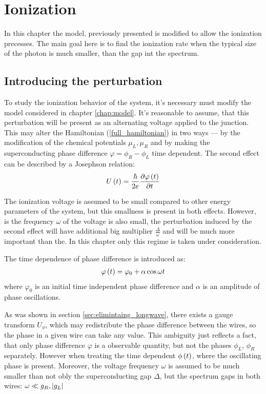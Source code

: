 \chapter{Ionization}

In this chapter the model, previously presented is modified to allow the ionization precesses. The main goal here is to find the ionization rate when the typical size of the photon is much smaller, than the gap int the spectrum.

\section{Introducing the perturbation}

To study the ionization behavior of the system, it's necessary must modify the model considered in chapter \ref{chap:model}. It's reasonable to assume, that this perturbation will be present as an alternating voltage applied to the junction. This may alter the Hamiltonian (\ref{full_hamiltonian}) in two ways --- by the modification of the chemical potentials $ \mu_L, \mu_R $ and by making the superconducting phase difference $ \varphi=\phi_R-\phi_L $ time dependent. The second effect can be described by a Josephson relation:
\begin{gather}
	U\left(t\right)
	=
	\frac{\hbar}{2e}
	\frac{\partial\varphi\left(t\right)}{\partial t}
\end{gather}

The ionization voltage is assumed to be small compared to other energy parameters of the system, but this smallness is present in both effects. However, is the frequency $ \omega $ of the voltage is also small, the perturbation induced by the second effect will have additional big multiplier $ \frac{\Delta}{\omega} $ and will be much more important than the. In this chapter only this regime is taken under consideration.

The time dependence of phase difference is introduced as:
\begin{gather}
	\varphi\left(t\right)=\varphi_0+\alpha\cos\omega t
\end{gather}
where $ \varphi_0 $ is an initial time independent phase difference and $ \alpha $ is an amplitude of phase oscillations.

As was shown in section \ref{sec:elimintaing_longwave}, there exists a gauge transform $ U_\phi $, which may redistribute the phase difference between the wires, so the phase in a given wire can take any value. This ambiguity just reflects a  fact, that only phase difference $ \varphi $ is a observable quantity, but not the phases $ \phi_L $, $ \phi_R $ separately. However when treating the time dependent $ \phi\left(t\right) $, where the oscillating phase is present. Moreover, the voltage frequency $ \omega $ is assumed to be much smaller than not obly the superconducting gap $ \Delta $, but the spectrum gaps in both wires: $ \omega\ll g_R, \left|g_L\right| $



